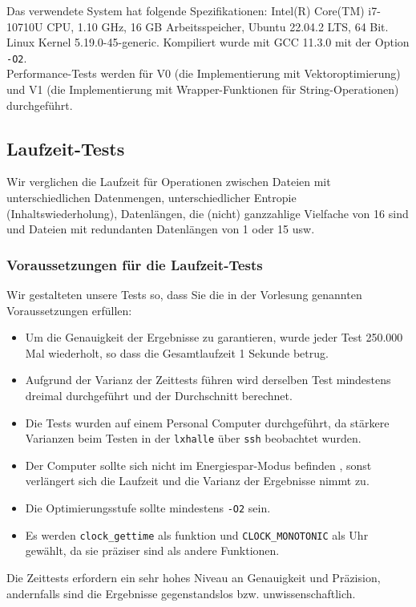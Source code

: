 Das verwendete System hat folgende Spezifikationen: Intel(R) Core(TM) i7-10710U
CPU, 1.10 GHz, 16 GB Arbeitsspeicher, Ubuntu 22.04.2 LTS, 64 Bit.
Linux Kernel 5.19.0-45-generic.
Kompiliert wurde mit GCC 11.3.0 mit der Option \texttt{-O2}.
\\
Performance-Tests werden für V0 (die Implementierung mit Vektoroptimierung)
und V1 (die Implementierung mit Wrapper-Funktionen für String-Operationen) durchgeführt.

\subsection{Laufzeit-Tests}
Wir verglichen die Laufzeit für Operationen zwischen Dateien mit unterschiedlichen Datenmengen,
 unterschiedlicher Entropie (Inhaltswiederholung), Datenlängen, die
(nicht) ganzzahlige Vielfache von 16 sind und Dateien mit redundanten 
Datenlängen von 1 oder 15 usw.

\subsubsection{Voraussetzungen für die Laufzeit-Tests}
Wir gestalteten unsere Tests so, dass Sie die in der Vorlesung genannten 
Voraussetzungen \cite{benchmarking} erfüllen: 
\begin{itemize}
    \item Um die Genauigkeit der Ergebnisse zu garantieren, wurde jeder Test 250.000
          Mal wiederholt, so dass die Gesamtlaufzeit 1 Sekunde betrug.
    \item Aufgrund der Varianz der Zeittests führen wird derselben Test
          mindestens dreimal durchgeführt und der Durchschnitt berechnet.
    \item Die Tests wurden auf einem Personal Computer durchgeführt, da stärkere 
         Varianzen beim Testen in der \texttt{lxhalle} über \texttt{ssh} beobachtet wurden. 
    \item Der Computer sollte sich nicht im Energiespar-Modus befinden \cite{energySaving}, sonst
          verlängert sich die Laufzeit und die Varianz der Ergebnisse nimmt zu.
    \item Die Optimierungsstufe sollte mindestens \texttt{-O2} sein. 
    \item Es werden \texttt{clock\_gettime} als funktion und \texttt{CLOCK\_MONOTONIC} als Uhr
          gewählt, da sie präziser sind als andere Funktionen.  
\end{itemize}
  
Die Zeittests erfordern ein sehr hohes Niveau an Genauigkeit und Präzision, \cite{energySaving}
andernfalls sind die Ergebnisse gegenstandslos bzw. unwissenschaftlich.

